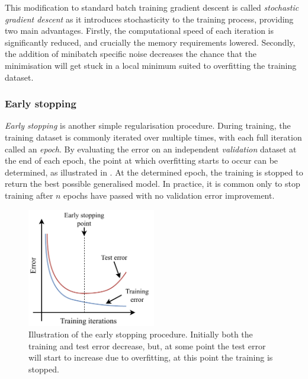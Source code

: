 This modification to standard batch training gradient descent is called \emph{stochastic gradient
    descent} as it introduces stochasticity to the training process, providing two main
    advantages. Firstly, the computational speed of each iteration is significantly reduced, and
    crucially the memory requirements lowered. Secondly, the addition of minibatch specific noise
    decreases the chance that the minimisation will get stuck in a local minimum suited to
    overfitting the training dataset.

\subsubsection*{Early stopping} %

\emph{Early stopping} is another simple regularisation procedure. During training, the training
dataset is commonly iterated over multiple times, with each full iteration called an \emph{epoch}.
By evaluating the error on an independent \emph{validation} dataset at the end of each epoch, the
point at which overfitting starts to occur can be determined, as illustrated in
. At the determined epoch, the training is stopped to return the
best possible generalised model. In practice, it is common only to stop training after $n$ epochs
have passed with no validation error improvement.

\begin{figure} %
    \includegraphics[width=0.5\textwidth]{diagrams/6-cnn/early_stopping.pdf}
    \caption[Illustration of the early stopping procedure]
    {Illustration of the early stopping procedure. Initially both the training and test error
        decrease, but, at some point the test error will start to increase due to overfitting, at
        this point the training is stopped.}
    \label{fig:early_stopping}
\end{figure}

